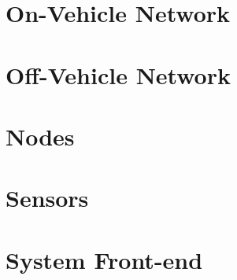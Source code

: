 
\section{On-Vehicle Network}






\section{Off-Vehicle Network}

\section{Nodes}

\section{Sensors}

\section{System Front-end}
